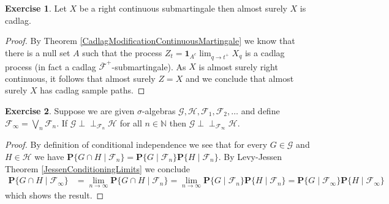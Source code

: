 \documentclass{amsbook}
\theoremstyle{definition}
\newtheorem{xca}{Exercise}
\theoremstyle{remark}
\newcommand{\Independent}{\perp \! \! \! \perp}
\newcommand{\cindependent}[3]{#1 \Independent_{#3} #2}
\newcommand{\cprobability}[2]{\textbf{P}\{#2 \mid #1\}}
\newcommand{\characteristic}[1]{\textbf{1}_{#1}}
\newcommand{\naturals}{\mathbb{N}}
\begin{document}
\begin{xca}Let $X$ be a right continuous
  submartingale then almost surely $X$ is cadlag.
\end{xca}
\begin{proof}
By Theorem \ref{CadlagModificationContinuousMartingale} we know that
there is a null set $A$ such that
the process $Z_t = \characteristic{A^c} \lim_{q \to t^+}X_q$ is a
cadlag process (in fact a cadlag $\overline{\mathcal{F}}^+$-submartingale).
As $X$ is almost surely right continuous, it follows that almost surely $Z = X$ and we
conclude that almost surely $X$ has cadlag sample paths.
\end{proof}

\begin{xca}Suppose we are given $\sigma$-algebras $\mathcal{G},
  \mathcal{H}, \mathcal{F}_1, \mathcal{F}_2, \dotsc$ and define
  $\mathcal{F}_\infty = \bigvee_n \mathcal{F}_n$.  If
  $\cindependent{\mathcal{G}}{\mathcal{H}}{\mathcal{F}_n}$ for all $n
  \in \naturals$ then $\cindependent{\mathcal{G}}{\mathcal{H}}{\mathcal{F}_\infty}$.
\end{xca}
\begin{proof}
By definition of conditional independence we see that for every $G \in
\mathcal{G}$ and $H \in \mathcal{H}$ we have
$\cprobability{\mathcal{F}_n}{G \cap H} =
\cprobability{\mathcal{F}_n}{G} \cprobability{\mathcal{F}_n}{H}$.  By
Levy-Jessen Theorem \ref{JessenConditioningLimits} we conclude
\begin{align*}
\cprobability{\mathcal{F}_\infty}{G \cap H} &=  \lim_{n \to \infty} \cprobability{\mathcal{F}_n}{G \cap H} =
 \lim_{n \to \infty}\cprobability{\mathcal{F}_n}{G}
 \cprobability{\mathcal{F}_n}{H} = \cprobability{\mathcal{F}_\infty}{G}
 \cprobability{\mathcal{F}_\infty}{H}
\end{align*}
which shows the result.
\end{proof}
\end{document}
